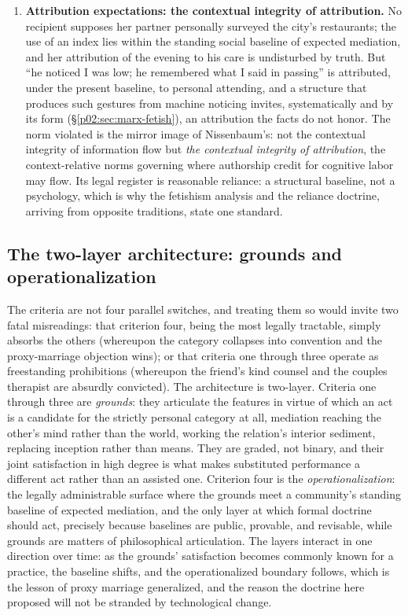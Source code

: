 \documentclass[11pt,a4paper]{article}
\newcommand{\term}[1]{\textit{\textcolor{pinkitalic}{#1}}}
\begin{document}
\begin{enumerate}[leftmargin=2em, itemsep=0.35em]
\item \textbf{Attribution expectations: the contextual integrity of attribution.} No recipient supposes her partner personally surveyed the city's restaurants; the use of an index lies within the standing social baseline of expected mediation, and her attribution of the evening to his care is undisturbed by truth. But ``he noticed I was low; he remembered what I said in passing'' is attributed, under the present baseline, to personal attending, and a structure that produces such gestures from machine noticing invites, systematically and by its form (\S\ref{p02:sec:marx-fetish}), an attribution the facts do not honor. The norm violated is the mirror image of Nissenbaum's: not the contextual integrity of information flow but \term{the contextual integrity of attribution}, the context-relative norms governing where authorship credit for cognitive labor may flow. Its legal register is reasonable reliance: a structural baseline, not a psychology, which is why the fetishism analysis and the reliance doctrine, arriving from opposite traditions, state one standard.
\end{enumerate}

\subsection{The two-layer architecture: grounds and operationalization}
\label{p02:sec:synthesis-architecture}

The criteria are not four parallel switches, and treating them so would invite two fatal misreadings: that criterion four, being the most legally tractable, simply absorbs the others (whereupon the category collapses into convention and the proxy-marriage objection wins); or that criteria one through three operate as freestanding prohibitions (whereupon the friend's kind counsel and the couples therapist are absurdly convicted). The architecture is two-layer. Criteria one through three are \emph{grounds}: they articulate the features in virtue of which an act is a candidate for the strictly personal category at all, mediation reaching the other's mind rather than the world, working the relation's interior sediment, replacing inception rather than means. They are graded, not binary, and their joint satisfaction in high degree is what makes substituted performance a different act rather than an assisted one. Criterion four is the \emph{operationalization}: the legally administrable surface where the grounds meet a community's standing baseline of expected mediation, and the only layer at which formal doctrine should act, precisely because baselines are public, provable, and revisable, while grounds are matters of philosophical articulation. The layers interact in one direction over time: as the grounds' satisfaction becomes commonly known for a practice, the baseline shifts, and the operationalized boundary follows, which is the lesson of proxy marriage generalized, and the reason the doctrine here proposed will not be stranded by technological change.
\end{document}
